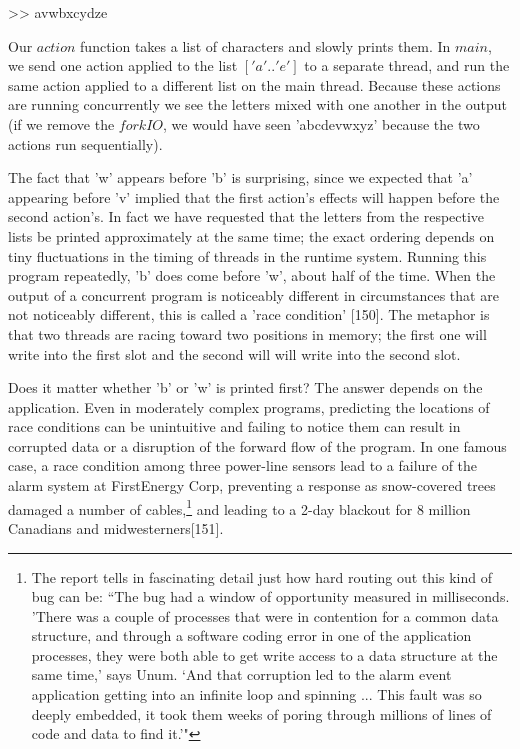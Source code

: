 \documentclass[]{article}
\begin{document}
\textgreater{}\textgreater{} avwbxcydze

\doublespacing

Our \(action\) function takes a list of characters and slowly prints
them. In \(main\), we send one action applied to the list \(['a'..'e']\)
to a separate thread, and run the same action applied to a different
list on the main thread. Because these actions are running concurrently
we see the letters mixed with one another in the output (if we remove
the \(forkIO\), we would have seen 'abcdevwxyz' because the two actions
run sequentially).

The fact that 'w' appears before 'b' is surprising, since we expected
that 'a' appearing before 'v' implied that the first action's effects
will happen before the second action's. In fact we have requested that
the letters from the respective lists be printed approximately at the
same time; the exact ordering depends on tiny fluctuations in the timing
of threads in the runtime system. Running this program repeatedly, 'b'
does come before 'w', about half of the time. When the output of a
concurrent program is noticeably different in circumstances that are not
noticeably different, this is called a 'race condition' {[}150{]}. The
metaphor is that two threads are racing toward two positions in memory;
the first one will write into the first slot and the second will will
write into the second slot.

Does it matter whether 'b' or 'w' is printed first? The answer depends
on the application. Even in moderately complex programs, predicting the
locations of race conditions can be unintuitive and failing to notice
them can result in corrupted data or a disruption of the forward flow of
the program. In one famous case, a race condition among three power-line
sensors lead to a failure of the alarm system at FirstEnergy Corp,
preventing a response as snow-covered trees damaged a number of
cables,\footnote{The report tells in fascinating detail just how hard
  routing out this kind of bug can be: ``The bug had a window of
  opportunity measured in milliseconds. 'There was a couple of processes
  that were in contention for a common data structure, and through a
  software coding error in one of the application processes, they were
  both able to get write access to a data structure at the same time,'
  says Unum. `And that corruption led to the alarm event application
  getting into an infinite loop and spinning ... This fault was so
  deeply embedded, it took them weeks of poring through millions of
  lines of code and data to find it.'"} and leading to a 2-day blackout
for 8 million Canadians and midwesterners{[}151{]}.
\end{document}
